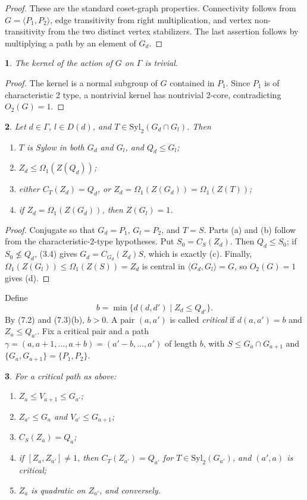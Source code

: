 \documentclass[11pt]{article}
\theoremstyle{plain}
\theoremstyle{stmplain}
\newtheorem{stm}{}[section]
\begin{document}
\begin{proof}
These are the standard coset-graph properties. Connectivity follows from
$G=\langle P_1,P_2\rangle$, edge transitivity from right multiplication,
and vertex non-transitivity from the two distinct vertex stabilizers. The
last assertion follows by multiplying a path by an element of $G_d$.
\end{proof}

\begin{stm}\label{st:7.2}
The kernel of the action of $G$ on $\Gamma$ is trivial.
\end{stm}

\begin{proof}
The kernel is a normal subgroup of $G$ contained in $P_1$. Since $P_1$ is
of characteristic 2 type, a nontrivial kernel has nontrivial 2-core,
contradicting $O_2(G)=1$.
\end{proof}

\begin{stm}\label{st:7.3}
Let $d\in\Gamma$, $l\in D(d)$, and
$T\in\mathrm{Syl}_2(G_d\cap G_l)$. Then
\begin{enumerate}
\item[(a)] $T$ is Sylow in both $G_d$ and $G_l$, and $Q_d\le G_l$;
\item[(b)] $Z_d\le\Omega_1(Z(Q_d))$;
\item[(c)] either $C_T(Z_d)=Q_d$, or
  $Z_d=\Omega_1(Z(G_d))=\Omega_1(Z(T))$;
\item[(d)] if $Z_d=\Omega_1(Z(G_d))$, then $Z(G_l)=1$.
\end{enumerate}
\end{stm}

\begin{proof}
Conjugate so that $G_d=P_1$, $G_l=P_2$, and $T=S$. Parts (a) and (b)
follow from the characteristic-2-type hypotheses. Put $S_0=C_S(Z_d)$.
Then $Q_d\le S_0$; if $S_0\nleq Q_d$, (3.4) gives
$G_d=C_{G_d}(Z_d)S$, which is exactly (c). Finally,
$\Omega_1(Z(G_l))\le\Omega_1(Z(S))=Z_d$ is central in
$\langle G_d,G_l\rangle=G$, so $O_2(G)=1$ gives (d).
\end{proof}

\noindent Define
\[
 b=\min\{d(d,d')\mid Z_d\le Q_{d'}\}.
\]
By (7.2) and (7.3)(b), $b>0$. A pair $(a,a')$ is called \emph{critical}
if $d(a,a')=b$ and $Z_a\le Q_{a'}$. Fix a critical pair and a path
$\gamma=(a,a+1,\ldots,a+b)=(a'-b,\ldots,a')$ of length $b$, with
$S\le G_a\cap G_{a+1}$ and $\{G_a,G_{a+1}\}=\{P_1,P_2\}$.

\begin{stm}\label{st:7.4}
For a critical path as above:
\begin{enumerate}
\item[(a)] $Z_a\le V_{a+1}\le G_{a'}$;
\item[(b)] $Z_{a'}\le G_a$ and $V_{a'}\le G_{a+1}$;
\item[(c)] $C_S(Z_a)=Q_a$;
\item[(d)] if $[Z_a,Z_{a'}]\ne1$, then
  $C_T(Z_{a'})=Q_{a'}$ for $T\in\mathrm{Syl}_2(G_{a'})$, and
  $(a',a)$ is critical;
\item[(e)] $Z_a$ is quadratic on $Z_{a'}$, and conversely.
\end{enumerate}
\end{stm}
\end{document}
